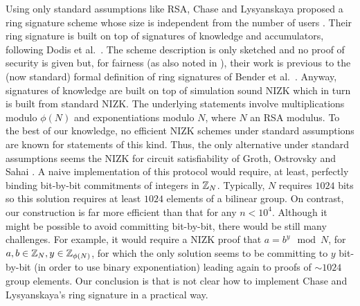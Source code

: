 Using only standard assumptions like RSA, Chase and Lysyanskaya proposed a ring signature scheme whose size is independent from the number of users \cite{C:ChaLys06}. %
Their ring signature is built on top of
signatures of knowledge and accumulators, following Dodis et al.~\cite{EC:DKNS04}. The scheme description is only sketched and no proof of security is given but, for fairness (as also noted in \cite{AC:MalSch17}), their work is previous to the (now standard) formal definition of ring signatures of Bender et al.~\cite{TCC:BenKatMor06}.
Anyway, signatures of knowledge are built on top of simulation sound NIZK which in turn is built from standard NIZK. The underlying statements involve multiplications modulo $\phi(N)$ and exponentiations modulo $N$, where $N$ an RSA modulus. To the best of our knowledge, no efficient NIZK schemes under standard assumptions are known for statements of this kind. Thus, the only alternative under standard assumptions seems the NIZK for circuit satisfiability of Groth, Ostrovsky and Sahai \cite{EC:GroOstSah06}. A naive implementation of this protocol would require, at least, perfectly binding bit-by-bit commitments of integers in $\mathbb{Z}_N$. Typically, $N$ requires $1024$ bits so this solution requires at least $1024$ elements of a bilinear group. On contrast, our construction is far more efficient than that for any $n<10^4$.
Although it might be possible to avoid committing bit-by-bit, there would be still many challenges. For example, it would require a NIZK proof that $a = b^y\mod N$, for $a,b\in\mathbb{Z}_N,y\in\mathbb{Z}_{\phi(N)}$, for which the only solution seems to be committing to $y$ bit-by-bit (in order to use binary exponentiation) leading again to proofs of $\sim1024$ group elements. Our conclusion is that is not clear how to implement Chase and Lysyanskaya's ring signature in a practical way.
